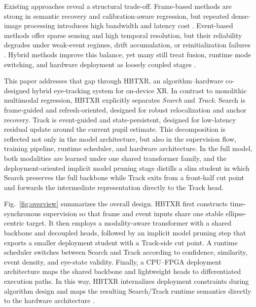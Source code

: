 \documentclass[journal]{IEEEtran}
\begin{document}
Existing approaches reveal a structural trade-off. Frame-based methods are strong in semantic recovery and calibration-aware regression, but repeated dense-image processing introduces high bandwidth and latency cost \cite{ref3}. Event-based methods offer sparse sensing and high temporal resolution, but their reliability degrades under weak-event regimes, drift accumulation, or reinitialization failures \cite{ref4,ref5,ref6}. Hybrid methods improve this balance, yet many still treat fusion, runtime mode switching, and hardware deployment as loosely coupled stages \cite{ref7}.

This paper addresses that gap through HBTXR, an algorithm--hardware co-designed hybrid eye-tracking system for on-device XR. In contrast to monolithic multimodal regression, HBTXR explicitly separates \emph{Search} and \emph{Track}. Search is frame-guided and refresh-oriented, designed for robust relocalization and anchor recovery. Track is event-guided and state-persistent, designed for low-latency residual update around the current pupil estimate. This decomposition is reflected not only in the model architecture, but also in the supervision flow, training pipeline, runtime scheduler, and hardware architecture. In the full model, both modalities are learned under one shared transformer family, and the deployment-oriented implicit model pruning stage distills a slim student in which Search preserves the full backbone while Track exits from a front-half cut point and forwards the intermediate representation directly to the Track head.

Fig.~\ref{fig:overview} summarizes the overall design. HBTXR first constructs time-synchronous supervision so that frame and event inputs share one stable ellipse-centric target. It then employs a modality-aware transformer with a shared backbone and decoupled heads, followed by an implicit model pruning step that exports a smaller deployment student with a Track-side cut point. A runtime scheduler switches between Search and Track according to confidence, similarity, event density, and eye-state validity. Finally, a CPU--FPGA deployment architecture maps the shared backbone and lightweight heads to differentiated execution paths. In this way, HBTXR internalizes deployment constraints during algorithm design and maps the resulting Search/Track runtime semantics directly to the hardware architecture \cite{ref12}.
\end{document}
